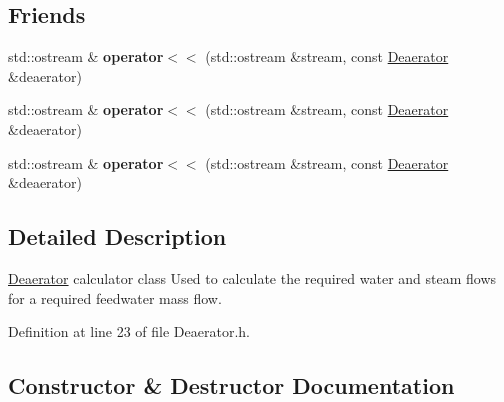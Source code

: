 \subsection*{Friends}
\begin{DoxyCompactItemize}
\item 
\mbox{\label{class_deaerator_ad213dc2face071fafa948df649cdf85e}} 
std\+::ostream \& {\bfseries operator$<$$<$} (std\+::ostream \&stream, const \hyperlink{class_deaerator}{Deaerator} \&deaerator)
\item 
\mbox{\label{class_deaerator_ad213dc2face071fafa948df649cdf85e}} 
std\+::ostream \& {\bfseries operator$<$$<$} (std\+::ostream \&stream, const \hyperlink{class_deaerator}{Deaerator} \&deaerator)
\item 
\mbox{\label{class_deaerator_ad213dc2face071fafa948df649cdf85e}} 
std\+::ostream \& {\bfseries operator$<$$<$} (std\+::ostream \&stream, const \hyperlink{class_deaerator}{Deaerator} \&deaerator)
\end{DoxyCompactItemize}


\subsection{Detailed Description}
\hyperlink{class_deaerator}{Deaerator} calculator class Used to calculate the required water and steam flows for a required feedwater mass flow. 

Definition at line 23 of file Deaerator.\+h.



\subsection{Constructor \& Destructor Documentation}
\mbox{\label{class_deaerator_a02311c34cbe46384187292e5f844984c}} 
